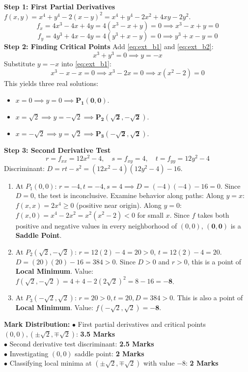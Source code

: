 \begin{solutionbox}
\textbf{Step 1: First Partial Derivatives}
$f(x,y) = x^4 + y^4 - 2(x - y)^2 = x^4 + y^4 - 2x^2 + 4xy - 2y^2$.
\[
f_x = 4x^3 - 4x + 4y = 4(x^3 - x + y) = 0 \implies x^3 - x + y = 0 \label{eq:ext_b1}
\]
\[
f_y = 4y^3 + 4x - 4y = 4(y^3 + x - y) = 0 \implies y^3 + x - y = 0 \label{eq:ext_b2}
\]
\textbf{Step 2: Finding Critical Points}
Add \eqref{eq:ext_b1} and \eqref{eq:ext_b2}:
\[
x^3 + y^3 = 0 \implies y = -x
\]
Substitute $y = -x$ into \eqref{eq:ext_b1}:
\[
x^3 - x - x = 0 \implies x^3 - 2x = 0 \implies x(x^2 - 2) = 0
\]
This yields three real solutions:
\begin{itemize}[leftmargin=6mm]
    \item $x = 0 \implies y = 0 \implies \mathbf{P_1(0,0)}$.
    \item $x = \sqrt{2} \implies y = -\sqrt{2} \implies \mathbf{P_2(\sqrt{2}, -\sqrt{2})}$.
    \item $x = -\sqrt{2} \implies y = \sqrt{2} \implies \mathbf{P_3(-\sqrt{2}, \sqrt{2})}$.
\end{itemize}

\textbf{Step 3: Second Derivative Test}
\[
r = f_{xx} = 12x^2 - 4, \quad s = f_{xy} = 4, \quad t = f_{yy} = 12y^2 - 4
\]
Discriminant: $D = rt - s^2 = (12x^2 - 4)(12y^2 - 4) - 16$.
\begin{enumerate}[label=(\roman*)]
    \item At $P_1(0,0)$:
    $r = -4, t = -4, s = 4 \implies D = (-4)(-4) - 16 = 0$.
    Since $D = 0$, the test is inconclusive. Examine behavior along paths:
    Along $y = x$: $f(x,x) = 2x^4 \ge 0$ (positive near origin).
    Along $y = 0$: $f(x,0) = x^4 - 2x^2 = x^2(x^2 - 2) < 0$ for small $x$.
    Since $f$ takes both positive and negative values in every neighborhood of $(0,0)$, $\mathbf{(0,0)}$ is a \textbf{Saddle Point}.
    \item At $P_2(\sqrt{2}, -\sqrt{2})$:
    $r = 12(2) - 4 = 20 > 0$, $t = 12(2) - 4 = 20$.
    $D = (20)(20) - 16 = 384 > 0$.
    Since $D > 0$ and $r > 0$, this is a point of \textbf{Local Minimum}.
    Value: $f(\sqrt{2}, -\sqrt{2}) = 4 + 4 - 2(2\sqrt{2})^2 = 8 - 16 = \mathbf{-8}$.
    \item At $P_3(-\sqrt{2}, \sqrt{2})$:
    $r = 20 > 0, t = 20, D = 384 > 0$.
    This is also a point of \textbf{Local Minimum}.
    Value: $f(-\sqrt{2}, \sqrt{2}) = \mathbf{-8}$.
\end{enumerate}

\begin{markingrubric}
\textbf{Mark Distribution:}
$\bullet$ First partial derivatives and critical points $(0,0), (\pm\sqrt{2}, \mp\sqrt{2})$: \textbf{3.5 Marks}\\
$\bullet$ Second derivative test discriminant: \textbf{2.5 Marks}\\
$\bullet$ Investigating $(0,0)$ saddle point: \textbf{2 Marks}\\
$\bullet$ Classifying local minima at $(\pm\sqrt{2}, \mp\sqrt{2})$ with value $-8$: \textbf{2 Marks}
\end{markingrubric}
\end{solutionbox}


